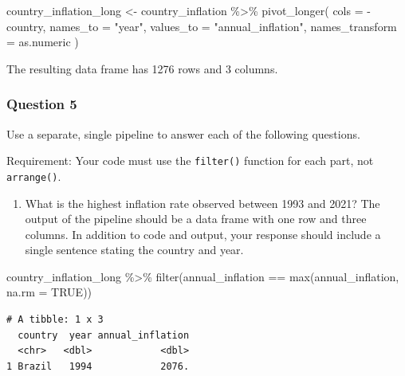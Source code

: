 \documentclass[
  letterpaper,
  DIV=11,
  numbers=noendperiod]{scrartcl}
\newenvironment{Shaded}{\begin{snugshade}}{\end{snugshade}}
\newcommand{\AttributeTok}[1]{\textcolor[rgb]{0.40,0.45,0.13}{#1}}
\newcommand{\ConstantTok}[1]{\textcolor[rgb]{0.56,0.35,0.01}{#1}}
\newcommand{\FunctionTok}[1]{\textcolor[rgb]{0.28,0.35,0.67}{#1}}
\newcommand{\NormalTok}[1]{\textcolor[rgb]{0.00,0.23,0.31}{#1}}
\newcommand{\OtherTok}[1]{\textcolor[rgb]{0.00,0.23,0.31}{#1}}
\newcommand{\SpecialCharTok}[1]{\textcolor[rgb]{0.37,0.37,0.37}{#1}}
\newcommand{\StringTok}[1]{\textcolor[rgb]{0.13,0.47,0.30}{#1}}
\providecommand{\tightlist}{%
  \setlength{\itemsep}{0pt}\setlength{\parskip}{0pt}}
\begin{document}
\begin{Shaded}
\begin{Highlighting}[]
\NormalTok{country\_inflation\_long }\OtherTok{\textless{}{-}}\NormalTok{ country\_inflation }\SpecialCharTok{\%\textgreater{}\%}
  \FunctionTok{pivot\_longer}\NormalTok{(}
    \AttributeTok{cols =} \SpecialCharTok{{-}}\NormalTok{country,}
    \AttributeTok{names\_to =} \StringTok{"year"}\NormalTok{,}
    \AttributeTok{values\_to =} \StringTok{"annual\_inflation"}\NormalTok{,}
    \AttributeTok{names\_transform =}\NormalTok{ as.numeric}
\NormalTok{  )}
\end{Highlighting}
\end{Shaded}

The resulting data frame has 1276 rows and 3 columns.

\subsubsection{Question 5}\label{question-5}

Use a separate, single pipeline to answer each of the following
questions.

Requirement: Your code must use the \texttt{filter()} function for each
part, not \texttt{arrange()}.

\begin{enumerate}
\def\labelenumi{\alph{enumi}.}
\tightlist
\item
  What is the highest inflation rate observed between 1993 and 2021? The
  output of the pipeline should be a data frame with one row and three
  columns. In addition to code and output, your response should include
  a single sentence stating the country and year.
\end{enumerate}

\begin{Shaded}
\begin{Highlighting}[]
\NormalTok{country\_inflation\_long }\SpecialCharTok{\%\textgreater{}\%}
  \FunctionTok{filter}\NormalTok{(annual\_inflation }\SpecialCharTok{==} \FunctionTok{max}\NormalTok{(annual\_inflation, }\AttributeTok{na.rm =} \ConstantTok{TRUE}\NormalTok{))}
\end{Highlighting}
\end{Shaded}

\begin{verbatim}
# A tibble: 1 x 3
  country  year annual_inflation
  <chr>   <dbl>            <dbl>
1 Brazil   1994            2076.
\end{verbatim}
\end{document}
